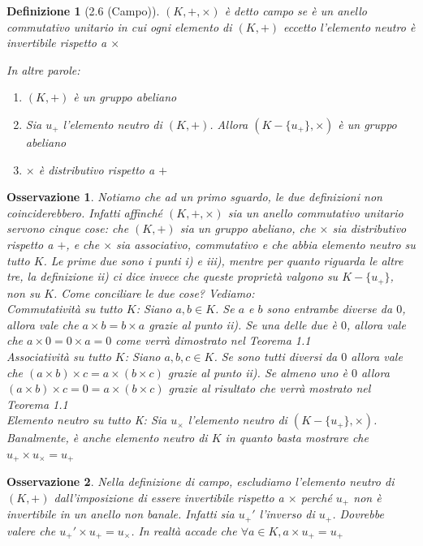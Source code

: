 \documentclass[11pt,a4paper]{article}
\theoremstyle{manuale}
\newtheorem*{definizione}{Definizione}
\newtheorem*{osservazione}{Osservazione}
\theoremstyle{manualecorsivo}
\begin{document}
	\begin{definizione}[2.6 (Campo)]
		$(K, +, \times)$ è detto campo se è un anello commutativo unitario in cui ogni elemento di $(K, +)$ eccetto l'elemento neutro è invertibile rispetto a $\times$
		
		In altre parole:
		\begin{enumerate}[label=\roman*)]
			\item $(K, +)$ è un gruppo abeliano
			\item Sia $u_{+}$ l'elemento neutro di $(K, +)$. Allora $(K - \{ u_{+} \}, \times)$ è un gruppo abeliano
			\item $\times$ è distributivo rispetto a $+$
		\end{enumerate}
		
	\end{definizione}
	
	\begin{osservazione}
		Notiamo che ad un primo sguardo, le due definizioni non coinciderebbero. Infatti affinché $(K, +, \times)$ sia un anello commutativo unitario servono cinque cose: che $(K, +)$ sia un gruppo abeliano, che $\times$ sia distributivo rispetto a $+$, e che $\times$ sia associativo, commutativo e che abbia elemento neutro su tutto $K$. Le prime due sono i punti \textit{i)} e \textit{iii)}, mentre per quanto riguarda le altre tre, la definizione \textit{ii)} ci dice invece che queste proprietà valgono su $K - \{u_{+}\}$, non su $K$. Come conciliare le due cose? Vediamo: \\
		\textit{Commutatività su tutto $K$:} Siano $a,b \in K$. Se $a$ e $b$ sono entrambe diverse da $0$, allora vale che $a \times b = b \times a$ grazie al punto \textit{ii)}. Se una delle due è $0$, allora vale che $a \times 0 = 0 \times a = 0$ come verrà dimostrato nel Teorema 1.1 \\
		\textit{Associatività su tutto $K$:} Siano $a,b,c \in K$. Se sono tutti diversi da $0$ allora vale che $(a \times b) \times c = a \times (b \times c)$ grazie al punto \textit{ii)}. Se almeno uno è $0$ allora $(a \times b) \times c = 0 = a \times (b \times c)$ grazie al risultato che verrà mostrato nel Teorema 1.1\\
		\textit{Elemento neutro su tutto K:} Sia $u_{\times}$ l'elemento neutro di $(K - \{u_{+}\}, \times)$. Banalmente, è anche elemento neutro di $K$ in quanto basta mostrare che $u_{+} \times u_{\times} = u_{+}$
	\end{osservazione}
	
	\begin{osservazione}
		Nella definizione di campo, escludiamo l'elemento neutro di $(K, +)$ dall'imposizione di essere invertibile rispetto a $\times$ perché $u_{+}$ non è invertibile in un anello non banale. Infatti sia $u_{+}'$ l'inverso di $u_{+}$. Dovrebbe valere che $u_{+}' \times u_{+} = u_{\times}$.
		In realtà accade che $\forall a \in K, a \times u_{+} = u_{+}$
	\end{osservazione}
	
\end{document}
